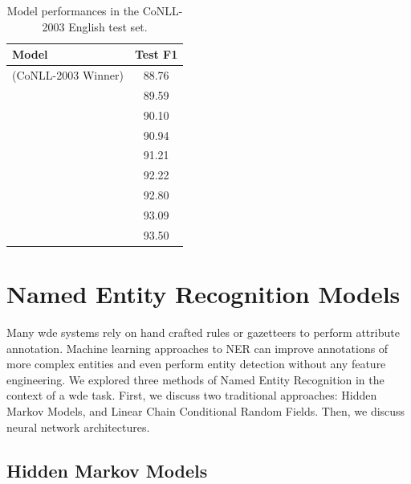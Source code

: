 \documentclass{nle}
\begin{document}
\begin{table}[h]
  \small
  \begin{center}
    \begin{tabular}{ lc }
      \toprule
      Model & Test F1 \\
      \midrule
       \cite{Florian2003} ({CoNLL-2003} Winner)    & 88.76 \\
       \cite{Collobert2011}                        & 89.59 \\
       \cite{Huang2015}                            & 90.10 \\
       \cite{Lample2016}                           & 90.94 \\
       \cite{Ma2016}                               & 91.21 \\
       \cite{Peters2018}                           & 92.22 \\
       \cite{Devlin2018}                           & 92.80 \\
       \cite{Akbik2018}                            & 93.09 \\
       \cite{Baevski2019}                          & 93.50 \\
      \bottomrule
    \end{tabular}
  \end{center}
  \caption{Model performances in the {CoNLL-2003} English test set.}
  \label{tab:ner_model_comparison}
\end{table}




\section{Named Entity Recognition Models}

Many \gls{wde} systems rely on hand crafted rules or gazetteers to perform
attribute annotation. Machine learning approaches to NER can improve annotations of 
more complex entities and even perform entity detection without any feature
engineering. We explored three methods of Named Entity Recognition
in the context of a \gls{wde} task. First, we discuss two traditional 
approaches: Hidden Markov Models, and Linear Chain Conditional Random Fields. Then,
we discuss neural network architectures.

\subsection{Hidden Markov Models}
\end{document}
